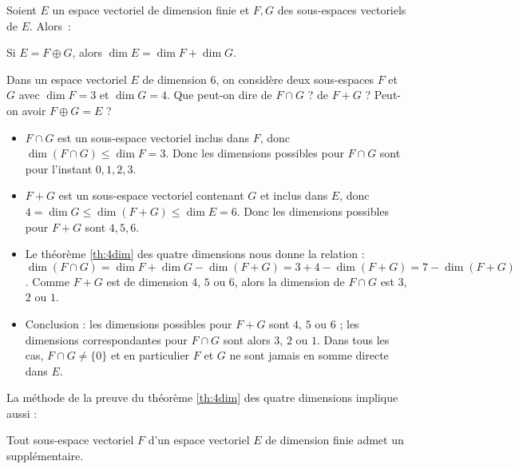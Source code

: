 \documentclass[class=report,crop=false]{standalone}
\begin{document}
\begin{theoreme}
\label{th:4dim}
Soient $E$ un espace vectoriel de dimension finie
et $F,G$ des sous-espaces vectoriels de $E$.
Alors~:
\end{theoreme}

\begin{corollaire}
Si $E = F \oplus G$, alors $\dim E = \dim F + \dim G$.
\end{corollaire}

\begin{exemple}
Dans un espace vectoriel $E$ de dimension $6$, on considère deux sous-espaces $F$ et $G$ avec
$\dim F=3$ et $\dim G=4$. Que peut-on dire de $F\cap G$ ? de $F+G$ ? Peut-on avoir $F\oplus G=E$ ?
\begin{itemize}
  \item $F \cap G$ est un sous-espace vectoriel inclus dans $F$, donc
  $\dim (F \cap G) \le \dim F=3$. Donc les dimensions possibles pour $F \cap G$ sont
  pour l'instant $0,1,2,3$.

  \item $F+G$ est un sous-espace vectoriel contenant $G$ et inclus dans $E$, donc
  $4=\dim G \le \dim(F+G) \le \dim E=6$. Donc les dimensions possibles
  pour $F + G$ sont $4,5,6$.

  \item Le théorème \ref{th:4dim} des quatre dimensions nous donne la relation :
  $\dim(F\cap G) =  \dim F + \dim G - \dim(F+G) = 3+4-\dim(F+G) =  7-\dim(F+G)$.
  Comme $F + G$ est de dimension $4$, $5$ ou $6$, alors la dimension de $F\cap G$ est
  $3$, $2$ ou $1$.

  \item Conclusion : les dimensions possibles pour $F+G$ sont $4$, $5$ ou $6$ ;
  les dimensions correspondantes pour $F \cap G$ sont alors $3$, $2$ ou $1$.
  Dans tous les cas, $F \cap G \neq \{0\}$ et en particulier $F$ et $G$ ne sont jamais en somme directe
  dans $E$.
\end{itemize}

\end{exemple}

La méthode de la preuve du théorème \ref{th:4dim} des quatre dimensions implique aussi :
\begin{corollaire}
Tout sous-espace vectoriel $F$ d'un espace vectoriel $E$
de dimension finie admet un supplémentaire.
\end{corollaire}
\end{document}
